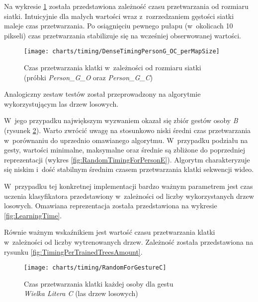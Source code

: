     \newpage
    Na wykresie \ref{fig:DenseTimingPerMapSize} została przedstawiona zależność czasu przetwarzania od rozmiaru siatki. Intuicyjnie dla małych wartości wraz z~rozrzedzaniem gęstości siatki maleje czas przetwarzania. Po osiągnięciu pewnego pułapu (w~okolicach 10 pikseli) czas przetwarzania stabilizuje się na wcześniej obserwowanej wartości.

      \begin{figure}[!ht]
        \centering
        \texttt{[image: charts/timing/DenseTimingPersonG\_OC\_perMapSize]}
        \caption[Czas przetwarzania klatki w~zależności od rozmiaru siatki]
                {Czas przetwarzania klatki w~zależności od rozmiaru siatki\\(próbki \textit{Person\_G\_O} oraz \textit{Person\_G\_C})}
        \label{fig:DenseTimingPerMapSize}
      \end{figure}

    Analogiczny zestaw testów został przeprowadzony na algorytmie wykorzystującym las drzew losowych.

    W~jego przypadku największym wyzwaniem okazał się zbiór gestów osoby \textit{B} (rysunek \ref{fig:RandomForGestureC}). Warto zwrócić uwagę na stosunkowo niski średni czas przetwarzania w~porównaniu do uprzednio omawianego algorytmu. W~przypadku podziału na gesty, wartości minimalne, maksymalne oraz średnie są zbliżone do poprzedniej reprezentacji (wykres \ref{fig:RandomTimingForPersonE}). Algorytm charakteryzuje się niskim i~dość stabilnym średnim czasem przetwarzania klatki sekwencji wideo.

    W~przypadku tej konkretnej implementacji bardzo ważnym parametrem jest czas uczenia klasyfikatora przedstawiony w~zależności od liczby wykorzystanych drzew losowych. Omawiana reprezentacja została przedstawiona na wykresie \ref{fig:LearningTime}.

    Równie ważnym wskaźnikiem jest wartość czasu przetwarzania klatki w~zależności od liczby wytrenowanych drzew. Zależność została przedstawiona na rysunku \ref{fig:TimingPerTrainedTreesAmount}.

    \newpage
      \begin{figure}[!ht]
        \centering
        \texttt{[image: charts/timing/RandomForGestureC]}
        \caption[Czas przetwarzania klatki każdej osoby dla gestu C (las drzew losowych)]
                {Czas przetwarzania klatki każdej osoby dla gestu\\\textit{Wielka Litera C} (las drzew losowych)}
        \label{fig:RandomForGestureC}
      \end{figure}

